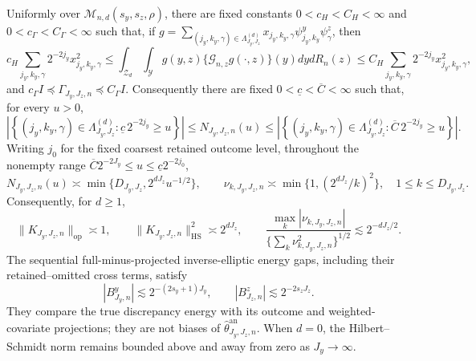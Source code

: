Uniformly over \(\mathcal M_{n,d}(s_y,s_z,\rho)\), there are fixed constants \(0<c_H<C_H<\infty\) and \(0<c_\Gamma<C_\Gamma<\infty\) such that, if \(g=\sum_{(j_y,k_y,\gamma)\in\Lambda_{J_y,J_z}^{(d)}}x_{j_y,k_y,\gamma}\psi^y_{j_y,k_y}\psi^z_\gamma\), then
\[
c_H\sum_{j_y,k_y,\gamma}2^{-2j_y}x_{j_y,k_y,\gamma}^2
\le\int_{\mathcal Z_d}\int_{\mathcal Y}g(y,z)\{\mathcal G_{n,z}g(\cdot,z)\}(y)dydR_n(z)
\le C_H\sum_{j_y,k_y,\gamma}2^{-2j_y}x_{j_y,k_y,\gamma}^2,
\]
and \(c_\Gamma I\preceq\Gamma_{J_y,J_z,n}\preceq C_\Gamma I\). Consequently there are fixed \(0<\underline c<\overline C<\infty\) such that, for every \(u>0\),
\[
\left|\left\{(j_y,k_y,\gamma)\in\Lambda_{J_y,J_z}^{(d)}:\underline c\,2^{-2j_y}\ge u\right\}\right|
\le N_{J_y,J_z,n}(u)
\le
\left|\left\{(j_y,k_y,\gamma)\in\Lambda_{J_y,J_z}^{(d)}:\overline C\,2^{-2j_y}\ge u\right\}\right|.
\]
Writing \(j_0\) for the fixed coarsest retained outcome level, throughout the nonempty range \(\overline C2^{-2J_y}\le u\le\underline c2^{-2j_0}\),
\[
N_{J_y,J_z,n}(u)\asymp\min\{D_{J_y,J_z},2^{dJ_z}u^{-1/2}\},
\qquad
\nu_{k,J_y,J_z,n}\asymp\min\{1,(2^{dJ_z}/k)^2\},\quad 1\le k\le D_{J_y,J_z}.
\]
Consequently, for \(d\ge1\),
\[
\|K_{J_y,J_z,n}\|_{\mathrm{op}}\asymp1,
\qquad \|K_{J_y,J_z,n}\|_{\mathrm{HS}}^2\asymp2^{dJ_z},
\qquad
\frac{\max_k|\nu_{k,J_y,J_z,n}|}{\{\sum_k\nu_{k,J_y,J_z,n}^2\}^{1/2}}
\lesssim2^{-dJ_z/2}.
\]
The sequential full-minus-projected inverse-elliptic energy gaps, including their retained--omitted cross terms, satisfy
\[
|B^y_{J_y,n}|\lesssim2^{-(2s_y+1)J_y},
\qquad
|B^z_{J_z,n}|\lesssim2^{-2s_zJ_z}.
\]
They compare the true discrepancy energy with its outcome and weighted-covariate projections; they are not biases of \(\widehat\theta^{\mathrm{an}}_{J_y,J_z,n}\). When \(d=0\), the Hilbert--Schmidt norm remains bounded above and away from zero as \(J_y\to\infty\).